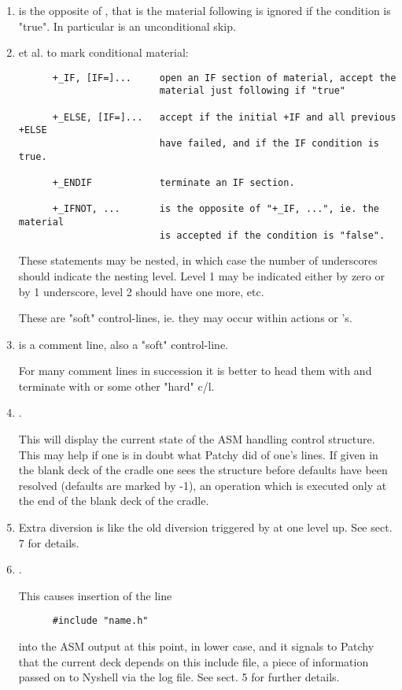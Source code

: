\begin{enumerate}
\item
{} is the opposite of ,
that is the material following is ignored if the condition is "true".
In particular  is an unconditional skip.


\item
{} et al.  to mark conditional material:
\begin{verbatim}
      +_IF, [IF=]...     open an IF section of material, accept the
                         material just following if "true"

      +_ELSE, [IF=]...   accept if the initial +IF and all previous +ELSE
                         have failed, and if the IF condition is true.

      +_ENDIF            terminate an IF section.

      +_IFNOT, ...       is the opposite of "+_IF, ...", ie. the material
                         is accepted if the condition is "false".
\end{verbatim}
These statements may be nested, in which case the number of underscores
should indicate the nesting level. Level 1 may be indicated either
by zero or by 1 underscore, level 2 should have one more, etc.

These are "soft" control-lines, ie. they may occur within actions
or 's.

\item
{} is a comment line, also a "soft" control-line.

For many comment lines in succession it is better to head them with
 and terminate with  or some other "hard" c/l.

\item
{}.

This will display the current state of the ASM handling control structure.
This may help if one is in doubt what Patchy did of one's  lines.
If given in the blank deck of the cradle one sees the structure before
defaults have been resolved (defaults are marked by -1), an operation
which is executed only at the end of the blank deck of the cradle.

\item
{}

Extra diversion is like the old diversion triggered by  at
one level up. See sect. 7 for details.

\item
{}.

This causes insertion of the line
\begin{verbatim}
      #include "name.h"
\end{verbatim}
into the ASM output at this point, in lower case, and it signals to
Patchy that the current deck depends on this include file, a piece
of information passed on to Nyshell via the log file. See sect. 5 for
further details.
\end{enumerate}


